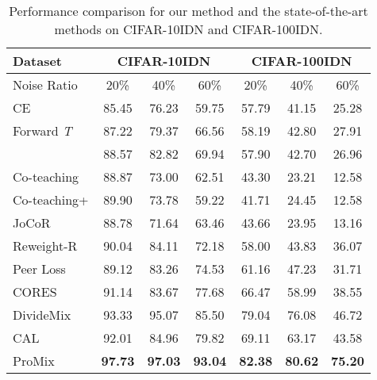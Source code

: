 \documentclass{article}
\begin{document}
\begin{table}[h]
  


 \centering
 \small
\tabcolsep=0.18cm

  \begin{tabular}{l|ccc|ccc}
    \toprule
    Dataset & \multicolumn{3}{c}{CIFAR-10IDN} & \multicolumn{3}{|c}{CIFAR-100IDN}\\
    \midrule
  
    Noise Ratio & 20\% & 40\% & 60\% & 20\% & 40\% & 60\% \\
    
    \midrule
    
    CE&85.45&76.23&59.75&57.79&41.15&25.28\\
    Forward \textit{T}&87.22&79.37&66.56&58.19&42.80&27.91\\
    &88.57&82.82&69.94&57.90&42.70&26.96\\
    Co-teaching&88.87&73.00&62.51&43.30&23.21&12.58\\
    Co-teaching+&89.90&73.78&59.22&41.71&24.45&12.58\\
    JoCoR&88.78&71.64&63.46&43.66&23.95&13.16\\
    Reweight-R&90.04&84.11&72.18&58.00&43.83&36.07\\
    Peer Loss&89.12&83.26&74.53&61.16&47.23&31.71\\
    CORES&91.14&83.67&77.68&66.47&58.99&38.55\\
    DivideMix&93.33&95.07&85.50&79.04&76.08&46.72\\
    CAL&92.01&84.96&79.82&69.11&63.17&43.58\\
    \midrule
    ProMix&\textbf{97.73}&\textbf{97.03}&\textbf{93.04}&\textbf{82.38}&\textbf{80.62}&\textbf{75.20}\\
    
    \bottomrule
  \end{tabular}

  \caption{Performance comparison for our method and the state-of-the-art methods on CIFAR-10IDN and CIFAR-100IDN.}\label{tab:idn}
\end{table}
\end{document}
